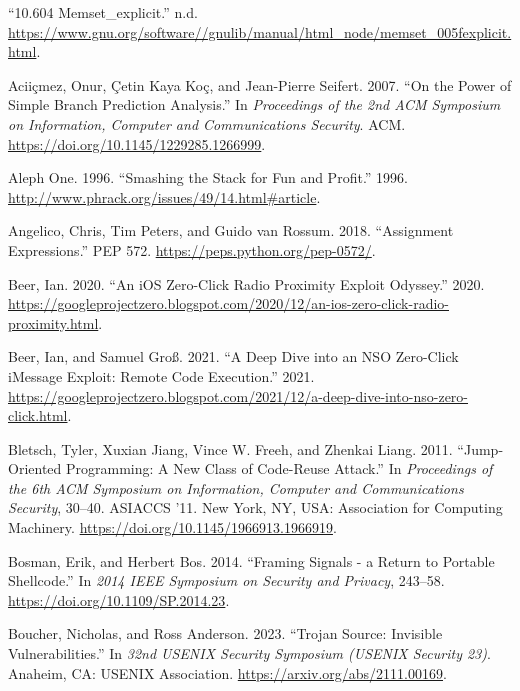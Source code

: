\documentclass[
  a4paper,
]{report}
\newlength{\cslhangindent}
\newenvironment{CSLReferences}[2] %
{\begin{list}{}{%
	\setlength{\itemindent}{0pt}
	\setlength{\leftmargin}{0pt}
	\setlength{\parsep}{0pt}
	\ifodd #1
	\setlength{\leftmargin}{\cslhangindent}
	\setlength{\itemindent}{-1\cslhangindent}
	\fi
	\setlength{\itemsep}{#2\baselineskip}}}
{\end{list}}
\begin{document}
\label{refs}
\begin{CSLReferences}{1}{0}
{``10.604 Memset\_explicit.''} n.d.
\url{https://www.gnu.org/software//gnulib/manual/html_node/memset_005fexplicit.html}.

Aciiçmez, Onur, Çetin Kaya Koç, and Jean-Pierre Seifert. 2007. {``On the
Power of Simple Branch Prediction Analysis.''} In \emph{Proceedings of
the 2nd {ACM} Symposium on Information, Computer and Communications
Security}. {ACM}. \url{https://doi.org/10.1145/1229285.1266999}.

Aleph One. 1996. {``Smashing the Stack for Fun and Profit.''} 1996.
\url{http://www.phrack.org/issues/49/14.html\#article}.

Angelico, Chris, Tim Peters, and Guido van Rossum. 2018. {``Assignment
Expressions.''} PEP 572. \url{https://peps.python.org/pep-0572/}.

Beer, Ian. 2020. {``An iOS Zero-Click Radio Proximity Exploit
Odyssey.''} 2020.
\url{https://googleprojectzero.blogspot.com/2020/12/an-ios-zero-click-radio-proximity.html}.

Beer, Ian, and Samuel Groß. 2021. {``A Deep Dive into an NSO Zero-Click
iMessage Exploit: Remote Code Execution.''} 2021.
\url{https://googleprojectzero.blogspot.com/2021/12/a-deep-dive-into-nso-zero-click.html}.

Bletsch, Tyler, Xuxian Jiang, Vince W. Freeh, and Zhenkai Liang. 2011.
{``Jump-Oriented Programming: A New Class of Code-Reuse Attack.''} In
\emph{Proceedings of the 6th ACM Symposium on Information, Computer and
Communications Security}, 30--40. ASIACCS '11. New York, NY, USA:
Association for Computing Machinery.
\url{https://doi.org/10.1145/1966913.1966919}.

Bosman, Erik, and Herbert Bos. 2014. {``Framing Signals - a Return to
Portable Shellcode.''} In \emph{2014 IEEE Symposium on Security and
Privacy}, 243--58. \url{https://doi.org/10.1109/SP.2014.23}.

Boucher, Nicholas, and Ross Anderson. 2023. {``Trojan Source: Invisible
Vulnerabilities.''} In \emph{32nd USENIX Security Symposium (USENIX
Security 23)}. Anaheim, CA: USENIX Association.
\url{https://arxiv.org/abs/2111.00169}.


\end{CSLReferences}
\end{document}
